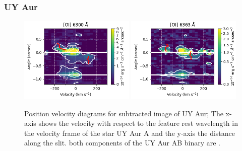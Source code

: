 \documentclass[twocolumn,trackchanges]{aastex63}
\begin{document}
\subsubsection{UY Aur}
\begin{figure}[h!]
\begin{center}
\includegraphics[width=0.49\textwidth]{UY_Aur_6300.png}
\includegraphics[width=0.49\textwidth]{UY_Aur_6363.png}
\caption{Position velocity diagrams for subtracted
image of UY Aur; The x-axis shows the velocity with respect to the
feature rest wavelength in the velocity frame of the star UY Aur
A and the y-axis the distance along the slit.  both components of the UY Aur AB
binary are .
\label{fig:UYAur}
}
\end{center}
\end{figure}
\end{document}
